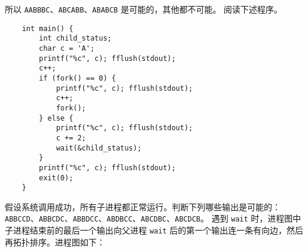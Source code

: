 \begin{problems}
\begin{figure}[H]
        \end{figure}
        所以 \verb|AABBBC|、\verb|ABCABB|、\verb|ABABCB| 是可能的，其他都不可能。
        \pro 阅读下述程序。
        \begin{verbatim}
    int main() {
        int child_status;
        char c = 'A';
        printf("%c", c); fflush(stdout);
        c++;
        if (fork() == 0) {
            printf("%c", c); fflush(stdout);
            c++;
            fork();
        } else {
            printf("%c", c); fflush(stdout);
            c += 2;
            wait(&child_status);
        } 
        printf("%c", c); fflush(stdout);
        exit(0);
    }
        \end{verbatim}
        假设系统调用成功，所有子进程都正常运行。判断下列哪些输出是可能的：\verb|ABBCCD|、\verb|ABBCDC|、\verb|ABBDCC|、\verb|ABDBCC|、\verb|ABCDBC|、\verb|ABCDCB|。
        \sol 遇到 \verb|wait| 时，进程图中子进程结束前的最后一个输出向父进程 \verb|wait| 后的第一个输出连一条有向边，然后再拓扑排序。进程图如下：
        \begin{figure}[H]
            \small
            \tt
            \centering
\end{figure}
\end{problems}
